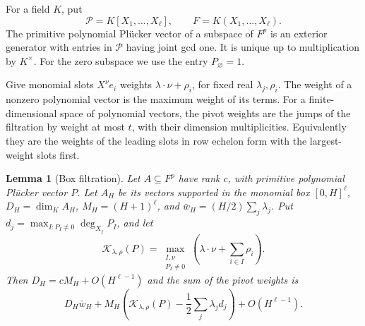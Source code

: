 \documentclass[11pt,a4paper,reqno]{amsart}
\newtheorem{lemma}[theorem]{Lemma}
\theoremstyle{definition}
\theoremstyle{remark}
\numberwithin{equation}{section}
\begin{document}
For a field \(K\), put
\[
             \mathcal P=K[X_1,\ldots,X_\ell],\qquad
             F=K(X_1,\ldots,X_\ell).
\]
The primitive polynomial
Pl\"ucker vector of a subspace of \(F^p\) is an exterior
generator with entries in \(\mathcal P\) having joint gcd one.
It is unique up to multiplication by \(K^\times\). For the
zero subspace we use the entry \(P_\varnothing=1\).

Give monomial slots \(X^\nu e_i\) weights
\(\lambda\cdot\nu+\rho_i\), for fixed real \(\lambda_j,\rho_i\).
The weight of a nonzero polynomial vector is the maximum weight
of its terms. For a finite-dimensional space of polynomial
vectors, the pivot weights are the jumps of the filtration by
weight at most \(t\), with their dimension multiplicities.
Equivalently they are the weights of the leading slots in row
echelon form with the largest-weight slots first.

\begin{lemma}[Box filtration]\label{lem:identity-filtration}
Let \(A\subseteq F^p\) have rank \(c\), with primitive polynomial
Pl\"ucker vector \(P\). Let \(A_H\) be its vectors supported in
the monomial box \([0,H]^\ell\), \(D_H=\dim_K A_H\),
\(M_H=(H+1)^\ell\), and \(\bar w_H=(H/2)\sum_j\lambda_j\).
Put \(d_j=\max_{I:P_I\ne0}\deg_{X_j}P_I\), and let
\[
  \mathcal K_{\lambda,\rho}(P)=
  \max_{\substack{I,\nu\\ [X^\nu]P_I\ne0}}
                        \left(\lambda\cdot\nu+\sum_{i\in I}\rho_i\right).
\]
Then \(D_H=cM_H+O(H^{\ell-1})\) and the sum of the pivot
weights is
\begin{equation}\label{eq:identity-filtration}
  D_H\bar w_H+
  M_H\left(\mathcal K_{\lambda,\rho}(P)
                      -\frac12\sum_j\lambda_jd_j\right)
     +O(H^{\ell-1}).
\end{equation}
\end{lemma}
\end{document}
